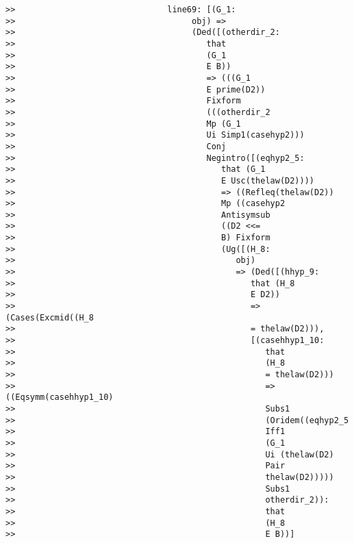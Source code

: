 \documentclass[12pt]{article}
\begin{document}
\begin{verbatim}
>>                               line69: [(G_1:
>>                                    obj) =>
>>                                    (Ded([(otherdir_2:
>>                                       that
>>                                       (G_1
>>                                       E B))
>>                                       => (((G_1
>>                                       E prime(D2))
>>                                       Fixform
>>                                       (((otherdir_2
>>                                       Mp (G_1
>>                                       Ui Simp1(casehyp2)))
>>                                       Conj
>>                                       Negintro([(eqhyp2_5:
>>                                          that (G_1
>>                                          E Usc(thelaw(D2))))
>>                                          => ((Refleq(thelaw(D2))
>>                                          Mp ((casehyp2
>>                                          Antisymsub
>>                                          ((D2 <<=
>>                                          B) Fixform
>>                                          (Ug([(H_8:
>>                                             obj)
>>                                             => (Ded([(hhyp_9:
>>                                                that (H_8
>>                                                E D2))
>>                                                => (Cases(Excmid((H_8
>>                                                = thelaw(D2))),
>>                                                [(casehhyp1_10:
>>                                                   that
>>                                                   (H_8
>>                                                   = thelaw(D2)))
>>                                                   => ((Eqsymm(casehhyp1_10)
>>                                                   Subs1
>>                                                   (Oridem((eqhyp2_5
>>                                                   Iff1
>>                                                   (G_1
>>                                                   Ui (thelaw(D2)
>>                                                   Pair
>>                                                   thelaw(D2)))))
>>                                                   Subs1
>>                                                   otherdir_2)):
>>                                                   that
>>                                                   (H_8
>>                                                   E B))]

\end{verbatim}
\end{document}
